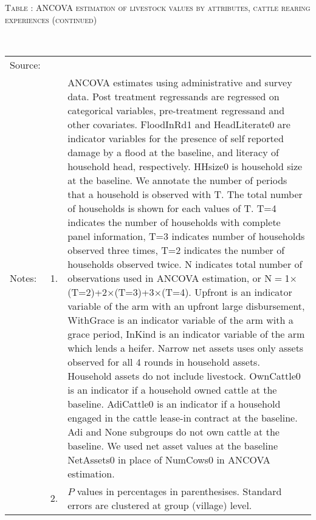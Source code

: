 \addtocounter{table}{-1}
\hspace{-1cm}\begin{minipage}[t]{14cm}
\hfil\textsc{\normalsize Table \thetable: ANCOVA estimation of livestock values by attributes, cattle rearing experiences (continued)\label{tab ANCOVA livestock values Experience attributes 2}}\\
\setlength{\tabcolsep}{1pt}
\setlength{\baselineskip}{8pt}
\renewcommand{\arraystretch}{.52}
\hfil{}\\
\renewcommand{\arraystretch}{.8}
\setlength{\tabcolsep}{1pt}
\begin{tabular}{>{\hfill\scriptsize}p{1cm}<{}>{\hfill\scriptsize}p{.25cm}<{}>{\scriptsize}p{12cm}<{\hfill}}
Source:& \multicolumn{2}{l}{\scriptsize Estimated with GUK administrative and survey data.}\\
Notes: & 1. & ANCOVA estimates using administrative and survey data. Post treatment regressands are regressed on categorical variables, pre-treatment regressand and other covariates. \textsf{FloodInRd1} and \textsf{HeadLiterate0} are indicator variables for the presence of self reported damage by a flood at the baseline, and literacy of household head, respectively. \textsf{HHsize0} is household size at the baseline. We annotate the number of periods that a household is observed with \textsf{T}. The total number of households is shown for each values of \textsf{T}. \textsf{T=4} indicates the number of households with complete panel information, \textsf{T=3} indicates number of households observed three times, \textsf{T=2} indicates the number of households observed twice. \textsf{N} indicates total number of observations used in ANCOVA estimation, or \textsf{N$=$1$\times$(T=2)+2$\times$(T=3)+3$\times$(T=4)}.  \textsf{Upfront} is an indicator variable of the arm with an upfront large disbursement, \textsf{WithGrace} is an indicator variable of the arm with a grace period, \textsf{InKind} is an indicator variable of the arm which lends a heifer. Narrow net assets uses only assets observed for all 4 rounds in household assets. Household assets do not include livestock. \textsf{OwnCattle0} is an indicator if a household owned cattle at the baseline. \textsf{AdiCattle0} is an indicator if a household engaged in the cattle lease-in contract at the baseline.  \textsf{Adi} and \textsf{None} subgroups do not own cattle at the baseline. We used net asset values at the baseline \textsf{NetAssets0} in place of \textsf{NumCows0} in ANCOVA estimation.\\
& 2. & $P$ values in percentages in parenthesises. Standard errors are clustered at group (village) level.
\end{tabular}
\end{minipage}



